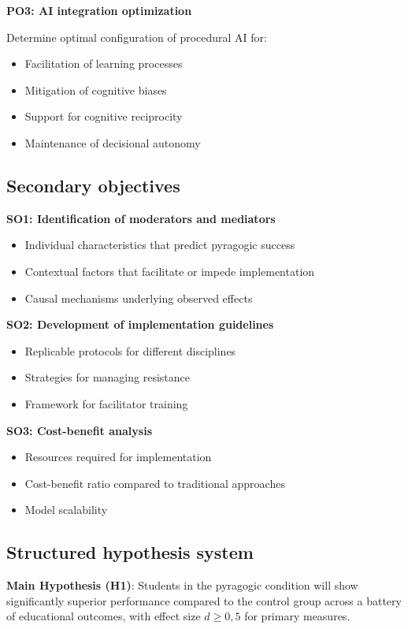 \textbf{PO3: AI integration optimization}

Determine optimal configuration of procedural AI for:
\begin{itemize}
    \item Facilitation of learning processes
    \item Mitigation of cognitive biases
    \item Support for cognitive reciprocity
    \item Maintenance of decisional autonomy
\end{itemize}

\subsection{Secondary objectives}

\textbf{SO1: Identification of moderators and mediators}
\begin{itemize}
    \item Individual characteristics that predict pyragogic success
    \item Contextual factors that facilitate or impede implementation
    \item Causal mechanisms underlying observed effects
\end{itemize}

\textbf{SO2: Development of implementation guidelines}
\begin{itemize}
    \item Replicable protocols for different disciplines
    \item Strategies for managing resistance
    \item Framework for facilitator training
\end{itemize}

\textbf{SO3: Cost-benefit analysis}
\begin{itemize}
    \item Resources required for implementation
    \item Cost-benefit ratio compared to traditional approaches
    \item Model scalability
\end{itemize}

\newpage

\subsection{Structured hypothesis system}

\textbf{Main Hypothesis (H1)}: 
Students in the pyragogic condition will show significantly superior performance compared to the control group across a battery of educational outcomes, with effect size $d \geq 0{,}5$ for primary measures.

